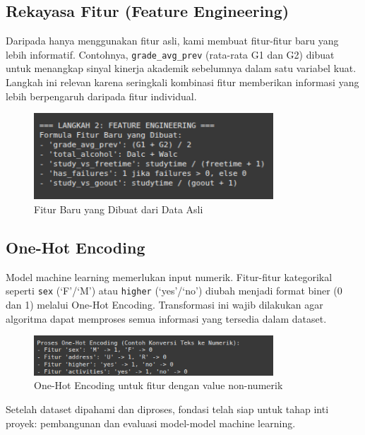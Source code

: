 \subsection{Rekayasa Fitur (Feature Engineering)}
Daripada hanya menggunakan fitur asli, kami membuat fitur-fitur baru yang lebih informatif. Contohnya, \texttt{grade\_avg\_prev} (rata-rata G1 dan G2) dibuat untuk menangkap sinyal kinerja akademik sebelumnya dalam satu variabel kuat. Langkah ini relevan karena seringkali kombinasi fitur memberikan informasi yang lebih berpengaruh daripada fitur individual.
\begin{figure}[h!]
    \centering
    \includegraphics[width=0.8\textwidth]{images/FeatureEng.png}
    \caption{Fitur Baru yang Dibuat dari Data Asli}
\end{figure}

\subsection{One-Hot Encoding}
Model machine learning memerlukan input numerik. Fitur-fitur kategorikal seperti \texttt{sex} (`F'/`M') atau \texttt{higher} (`yes'/`no') diubah menjadi format biner (0 dan 1) melalui One-Hot Encoding. Transformasi ini wajib dilakukan agar algoritma dapat memproses semua informasi yang tersedia dalam dataset.
\begin{figure}[h!]
    \centering
    \includegraphics[width=0.8\textwidth]{images/OHE.png}
    \caption{One-Hot Encoding untuk fitur dengan value non-numerik}
\end{figure}

\vspace{0.5cm}
Setelah dataset dipahami dan diproses, fondasi telah siap untuk tahap inti proyek: pembangunan dan evaluasi model-model machine learning.
